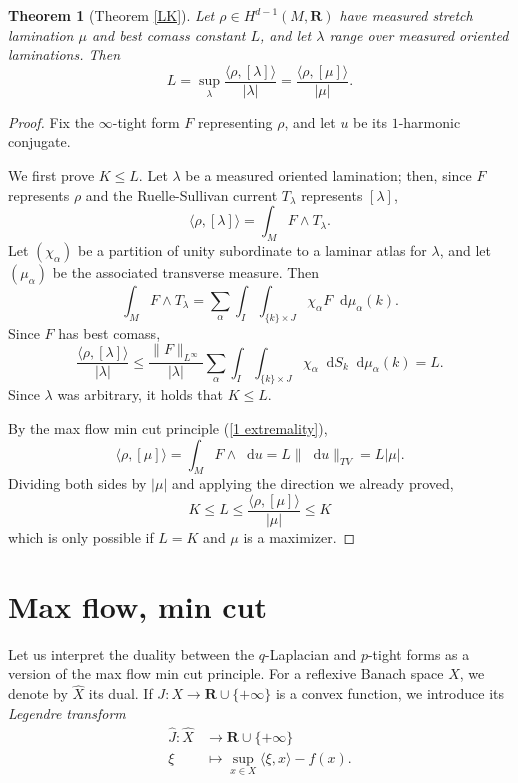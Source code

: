 \documentclass[reqno,11pt]{amsart}
\newcommand{\RR}{\mathbf{R}}
\newcommand*\dif{\mathop{}\!\mathrm{d}}
\newcommand{\dfn}[1]{\emph{#1}\index{#1}}
\newtheorem{theorem}{Theorem}[section]
\theoremstyle{definition}
\numberwithin{equation}{section}
\begin{document}
\begin{theorem}[Theorem \ref{LK}]\label{L equals K}
	Let $\rho \in H^{d - 1}(M, \RR)$ have measured stretch lamination $\mu$ and best comass constant $L$, and let $\lambda$ range over measured oriented laminations. Then 
	$$L = \sup_\lambda \frac{\langle \rho, [\lambda]\rangle}{|\lambda|} = \frac{\langle \rho, [\mu]\rangle}{|\mu|}.$$
\end{theorem}
\begin{proof}
Fix the $\infty$-tight form $F$ representing $\rho$, and let $u$ be its $1$-harmonic conjugate.

We first prove $K \leq L$.
Let $\lambda$ be a measured oriented lamination; then, since $F$ represents $\rho$ and the Ruelle-Sullivan current $T_\lambda$ represents $[\lambda]$,
$$\langle \rho, [\lambda]\rangle = \int_M F \wedge T_\lambda.$$
Let $(\chi_\alpha)$ be a partition of unity subordinate to a laminar atlas for $\lambda$, and let $(\mu_\alpha)$ be the associated transverse measure. Then 
$$\int_M F \wedge T_\lambda = \sum_\alpha \int_I \int_{\{k\} \times J} \chi_\alpha F \dif \mu_\alpha(k).$$
Since $F$ has best comass,
$$\frac{\langle \rho, [\lambda] \rangle}{|\lambda|}
\leq \frac{\|F\|_{L^\infty}}{|\lambda|} \sum_\alpha \int_I \int_{\{k\} \times J} \chi_\alpha \dif S_k \dif \mu_\alpha(k) = L.$$
Since $\lambda$ was arbitrary, it holds that $K \leq L$.

By the max flow min cut principle (\ref{1 extremality}),
$$\langle \rho, [\mu]\rangle = \int_M F \wedge \dif u = L \|\dif u\|_{TV} = L|\mu|.$$
Dividing both sides by $|\mu|$ and applying the direction we already proved,
$$K \leq L \leq \frac{\langle \rho, [\mu]\rangle}{|\mu|} \leq K$$
which is only possible if $L = K$ and $\mu$ is a maximizer.
\end{proof}

\appendix 
\section{Max flow, min cut}\label{Max Flow Min Cut}
Let us interpret the duality between the $q$-Laplacian and $p$-tight forms as a version of the max flow min cut principle. 
For a reflexive Banach space $X$, we denote by $\hat X$ its dual.
If $J: X \to \RR \cup \{+\infty\}$ is a convex function, we introduce its \dfn{Legendre transform}
\begin{align*}
	\hat J: \hat X &\to \RR \cup \{+\infty\}\\
	\xi &\mapsto \sup_{x \in X} \langle \xi, x\rangle - f(x).
\end{align*}
\end{document}
